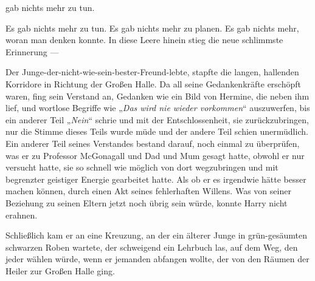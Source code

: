 
 gab nichts mehr zu tun.

\hplettrineextrapara


Es gab nichts mehr zu tun. Es gab nichts mehr zu planen. Es gab nichts mehr, woran man denken konnte. In diese Leere hinein stieg die neue schlimmste Erinnerung —

Der Junge-der-nicht-wie-sein-bester-Freund-lebte, stapfte die langen, hallenden Korridore in Richtung der Großen Halle. Da all seine Gedankenkräfte erschöpft waren, fing sein Verstand an, Gedanken wie ein Bild von Hermine, die neben ihm lief, und wortlose Begriffe wie „\emph{Das wird nie wieder vorkommen}“ auszuwerfen, bis ein anderer Teil „\emph{Nein}“ schrie und mit der Entschlossenheit, sie zurückzubringen, nur die Stimme dieses Teils wurde müde und der andere Teil schien unermüdlich. Ein anderer Teil seines Verstandes bestand darauf, noch einmal zu überprüfen, was er zu Professor McGonagall und Dad und Mum gesagt hatte, obwohl er nur versucht hatte, sie so schnell wie möglich von dort wegzubringen und mit begrenzter geistiger Energie gearbeitet hatte. Als ob er es irgendwie hätte besser machen können, durch einen Akt seines fehlerhaften Willens. Was von seiner Beziehung zu seinen Eltern jetzt noch übrig sein würde, konnte Harry nicht erahnen.

Schließlich kam er an eine Kreuzung, an der ein älterer Junge in grün-gesäumten schwarzen Roben wartete, der schweigend ein Lehrbuch las, auf dem Weg, den jeder wählen würde, wenn er jemanden abfangen wollte, der von den Räumen der Heiler zur Großen Halle ging.

